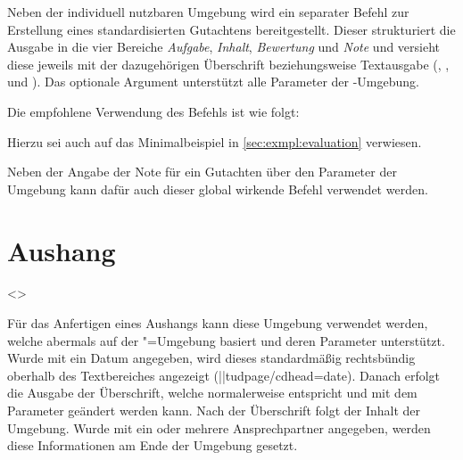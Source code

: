 \begin{DeclareEntity}{}
\begin{Declaration}
Neben der individuell nutzbaren Umgebung  wird ein 
separater Befehl zur Erstellung eines standardisierten Gutachtens 
bereitgestellt. Dieser strukturiert die Ausgabe in die vier Bereiche 
\emph{Aufgabe}, \emph{Inhalt}, \emph{Bewertung} und \emph{Note} und versieht 
diese jeweils mit der dazugehörigen Überschrift beziehungsweise Textausgabe 
(, ,  und 
). Das optionale Argument unterstützt alle Parameter der 
-Umgebung.
\end{Declaration}
%
\begin{Example}
Die empfohlene Verwendung des Befehls  ist wie folgt:
\begin{Code}[escapechar=§]
\end{Code}
Hierzu sei auch auf das Minimalbeispiel in \autoref{sec:exmpl:evaluation} 
verwiesen.%
\end{Example}

\begin{Declaration}
  {}
\printdeclarationlist

Neben der Angabe der Note für ein Gutachten über den Parameter 
 der Umgebung  kann dafür 
auch dieser global wirkende Befehl verwendet werden.
\end{Declaration}
%



\section{%
  Aushang%
}

\begin{Declaration}
  {}
  <>
\begin{Declaration}
  {}
\printdeclarationlist

Für das Anfertigen eines Aushangs kann diese Umgebung verwendet werden, welche
abermals auf der "=Umgebung basiert und deren Parameter 
unterstützt. Wurde mit  ein Datum angegeben, wird dieses 
standardmäßig rechtsbündig oberhalb des Textbereiches angezeigt 
(\Environment||{tudpage/cdhead=date}). Danach erfolgt die Ausgabe der 
Überschrift, welche normalerweise  entspricht und mit dem 
Parameter  geändert werden kann. Nach der 
Überschrift folgt der Inhalt der Umgebung. Wurde mit  ein 
oder mehrere Ansprechpartner angegeben, werden diese Informationen am Ende der 
Umgebung gesetzt.
\end{Declaration}
\end{Declaration}


\end{DeclareEntity}
